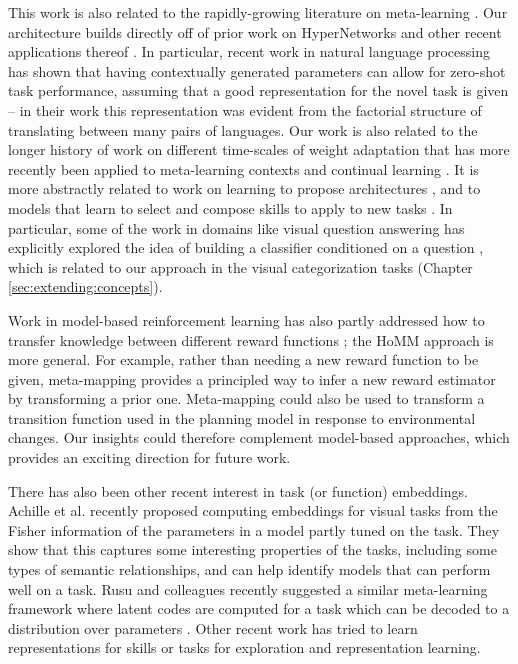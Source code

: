 This work is also related to the rapidly-growing literature on meta-learning \citep[e.g.][]{Vinyals2016, Santoro2016, Finn2017a, Finn2018, Stadie2018, Botvinick2019, Ravichandran2019}. Our architecture builds directly off of prior work on HyperNetworks \citep{Ha2016} and other recent applications thereof  \citep[e.g.][]{Brock2018a, Zhang2019, Li2019a, Rusu2019}. In particular, recent work in natural language processing has shown that having contextually generated parameters can allow for zero-shot task performance, assuming that a good representation for the novel task is given \citep{Platanios2017} -- in their work this representation was evident from the factorial structure of translating between many pairs of languages. Our work is also related to the longer history of work on different time-scales of weight adaptation \citep{Hinton1982, Kumaran2016} that has more recently been applied to meta-learning contexts \citep[e.g.][]{Ba2016, Munkhdalai2017, Garnelo2018} and continual learning \citep[e.g.]{Hu2019}. It is more abstractly related to work on learning to propose architectures \citep[e.g.][]{Zoph2016, Cao2019}, and to models that learn to select and compose skills to apply to new tasks \citep[e.g.][]{Andreas, Andreas2016, Tessler2016, Reed2015, Chang2019a}. In particular, some of the work in domains like visual question answering has explicitly explored the idea of building a classifier conditioned on a question \citep{Andreas, Andreasa}, which is related to our approach in the visual categorization tasks (Chapter \ref{sec:extending:concepts}).

Work in model-based reinforcement learning has also partly addressed how to transfer knowledge between different reward functions \citep[e.g.][]{Laroche2017}; the HoMM approach is more general. For example, rather than needing a new reward function to be given, meta-mapping provides a principled way to infer a new reward estimator by transforming a prior one. Meta-mapping could also be used to transform a transition function used in the planning model in response to environmental changes. Our insights could therefore complement model-based approaches, which provides an exciting direction for future work.

There has also been other recent interest in task (or function) embeddings. Achille et al. \citep{Achille2019} recently proposed computing embeddings for visual tasks from the Fisher information of the parameters in a model partly tuned on the task. They show that this captures some interesting properties of the tasks, including some types of semantic relationships, and can help identify models that can perform well on a task. Rusu and colleagues recently suggested a similar meta-learning framework where latent codes are computed for a task which can be decoded to a distribution over parameters \citep{Rusu2019}. Other recent work has tried to learn representations for skills \citep[e.g.][]{Eysenbach2019} or tasks \citep[e.g.]{Hsu2019} for exploration and representation learning.

